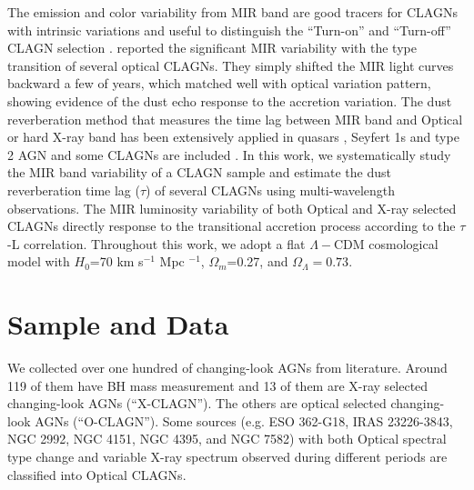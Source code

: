 \documentclass[linenumbers]{aastex631}
\begin{document}
The emission and color variability from MIR band are good tracers for CLAGNs with intrinsic variations and useful to distinguish the ``Turn-on'' and ``Turn-off'' CLAGN selection \citep{2018ApJ...862..109Y}.  \citet{2017ApJ...846L...7S} reported the significant MIR variability with the type transition of several optical CLAGNs. They simply shifted the MIR light curves backward a few of years, which matched well with optical variation pattern, showing evidence of the dust echo response to the accretion variation. The dust reverberation method that measures the time lag between MIR band and Optical or hard X-ray band has been extensively applied in quasars \citep[e.g.][]{2019ApJ...886...33L}, Seyfert 1s \citep[e.g.][]{2014ApJ...788..159K,2019ApJ...886...33L,2021MNRAS.501.3905M} and type 2 AGN \citep[e.g.][]{2020MNRAS.495.2921N} and some CLAGNs are included \citep[e.g.  ][]{2014ApJ...788..159K,2014ApJ...788...48S,2019ApJ...886...33L,2020MNRAS.491.4615K,2021ApJ...912..126L}. In this work, we systematically study the MIR band variability of a CLAGN sample and estimate the dust reverberation time lag ($\tau$) of several CLAGNs using multi-wavelength observations. The MIR luminosity variability of both Optical and X-ray selected CLAGNs directly response to the transitional accretion process according to the $\tau$-L correlation. Throughout this work, we adopt a flat $\Lambda-$CDM cosmological model with $H_0$=70 km s$^{-1}$ Mpc $^{-1}$, $\Omega_{m}$=0.27, and $\Omega_{\Lambda}=0.73 $.



\section{Sample and Data} \label{sec:sample}
We collected over one hundred of changing-look AGNs from literature. Around 119 of them have BH mass measurement and 13 of them are X-ray selected changing-look AGNs (``X-CLAGN''). The others are optical selected changing-look AGNs (``O-CLAGN''). Some sources (e.g. ESO 362-G18, IRAS 23226-3843, NGC 2992, NGC 4151, NGC 4395, and NGC 7582) with both Optical spectral type change and variable X-ray spectrum observed during different periods \citep[e.g.][]{2003MNRAS.342..422M,2011MNRAS.417.2571N,2014MNRAS.443.2862A,2015ApJ...815...55R,2017A&A...603A..50B,2020A&A...638A..91K} are classified into Optical CLAGNs. 
\end{document}
